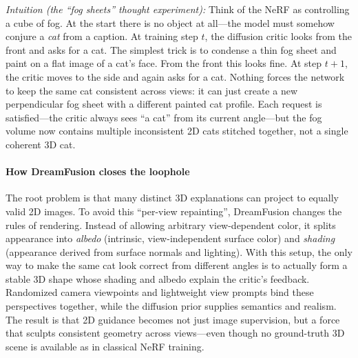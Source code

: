 \begin{enrichment}
\begin{enrichment}
        \noindent\textit{Intuition (the “fog sheets” thought experiment):} Think of the NeRF as controlling a cube of fog. At the start there is no object at all—the model must somehow conjure a \emph{cat} from a caption. At training step \(t\), the diffusion critic looks from the front and asks for a cat. The simplest trick is to condense a thin fog sheet and paint on a flat image of a cat’s face. From the front this looks fine. At step \(t{+}1\), the critic moves to the side and again asks for a cat. Nothing forces the network to keep the same cat consistent across views: it can just create a new perpendicular fog sheet with a different painted cat profile. Each request is satisfied—the critic always sees “a cat” from its current angle—but the fog volume now contains multiple inconsistent 2D cats stitched together, not a single coherent 3D cat.  
        
        \paragraph{How DreamFusion closes the loophole}
        The root problem is that many distinct 3D explanations can project to equally valid 2D images. To avoid this “per-view repainting”, DreamFusion changes the rules of rendering. Instead of allowing arbitrary view-dependent color, it splits appearance into \emph{albedo} (intrinsic, view-independent surface color) and \emph{shading} (appearance derived from surface normals and lighting). With this setup, the only way to make the same cat look correct from different angles is to actually form a stable 3D shape whose shading and albedo explain the critic’s feedback. Randomized camera viewpoints and lightweight view prompts bind these perspectives together, while the diffusion prior supplies semantics and realism. The result is that 2D guidance becomes not just image supervision, but a force that sculpts consistent geometry across views—even though no ground-truth 3D scene is available as in classical NeRF training.
        

\end{enrichment}
\end{enrichment}
